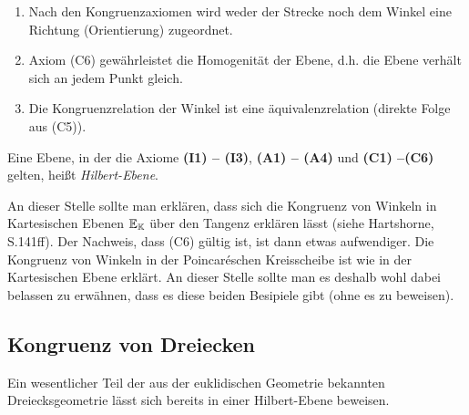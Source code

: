 \begin{bem}
    \renewcommand{\labelenumi}{\alph{enumi})} %
    \begin{enumerate}
        \item Nach den Kongruenzaxiomen wird weder der Strecke noch dem Winkel eine Richtung
            (Orientierung) zugeordnet.

        \item Axiom (C6) gewährleistet die Homogenität der Ebene, d.h. die Ebene verhält sich an
            jedem Punkt gleich.

        \item Die Kongruenzrelation der Winkel ist eine äquivalenzrelation (direkte Folge aus (C5)).
    \end{enumerate}
\end{bem}

\begin{defi}
    Eine Ebene, in der die Axiome {\bf (I1) -- (I3)}, {\bf (A1) -- (A4)} und {\bf (C1) --(C6)}
    gelten, heißt {\em Hilbert-Ebene}.
\end{defi}

\begin{bem}
    An dieser Stelle sollte man erklären, dass sich die Kongruenz von Winkeln in Kartesischen Ebenen
    $\mathbb E_{\mathbb K}$ über den Tangenz erklären lässt (siehe Hartshorne, S.141ff). Der Nachweis, dass (C6)
    gültig ist, ist dann etwas aufwendiger. Die Kongruenz von Winkeln in der Poincaréschen
    Kreisscheibe ist wie in der Kartesischen Ebene erklärt. An dieser Stelle sollte man es deshalb
    wohl dabei belassen zu erwähnen, dass es diese beiden Besipiele gibt (ohne es zu beweisen).
\end{bem}


\subsection*{Kongruenz von Dreiecken}

Ein wesentlicher Teil der aus der euklidischen Geometrie bekannten Dreiecksgeometrie lässt sich
bereits in einer Hilbert-Ebene beweisen.



